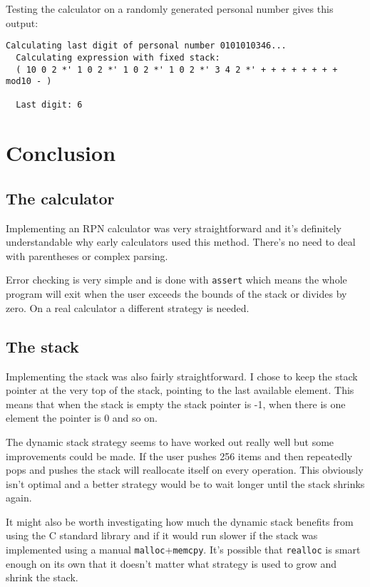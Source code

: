 \documentclass[a4paper,11pt]{article}
\begin{document}
Testing the calculator on a randomly generated personal number gives this output:
\begin{verbatim}
Calculating last digit of personal number 0101010346...
  Calculating expression with fixed stack:
  ( 10 0 2 *' 1 0 2 *' 1 0 2 *' 1 0 2 *' 3 4 2 *' + + + + + + + + mod10 - )

  Last digit: 6
\end{verbatim}

\section*{Conclusion}

\subsection*{The calculator}

Implementing an RPN calculator was very straightforward and it's definitely understandable why early calculators used this method. There's no need to deal with parentheses or complex parsing.

Error checking is very simple and is done with \texttt{assert} which means the whole program will exit when the user exceeds the bounds of the stack or divides by zero. On a real calculator a different strategy is needed.

\subsection*{The stack}

Implementing the stack was also fairly straightforward. I chose to keep the stack pointer at the very top of the stack, pointing to the last available element. This means that when the stack is empty the stack pointer is -1, when there is one element the pointer is 0 and so on.

The dynamic stack strategy seems to have worked out really well but some improvements could be made.
If the user pushes 256 items and then repeatedly pops and pushes the stack will reallocate itself on every operation.
This obviously isn't optimal and a better strategy would be to wait longer until the stack shrinks again.

It might also be worth investigating how much the dynamic stack benefits from using the C standard library and if it would run slower if the stack was implemented using a manual \texttt{malloc}+\texttt{memcpy}.
It's possible that \texttt{realloc} is smart enough on its own that it doesn't matter what strategy is used to grow and shrink the stack.
\end{document}
